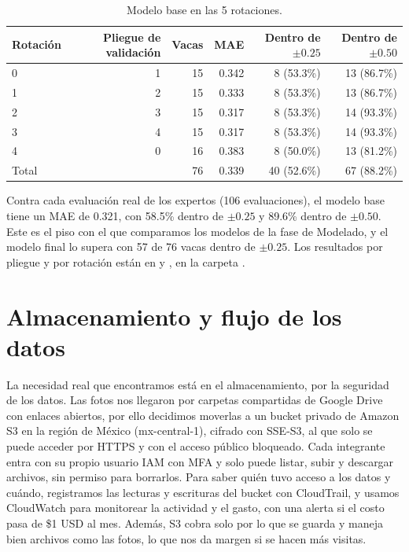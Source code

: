 \documentclass[11pt,letterpaper,DIV=12]{scrartcl}
\begin{document}
\begin{table}[H]
  \centering
  \small
  \caption{Modelo base en las 5 rotaciones.}
  \label{tab:modelo-base}
  \begin{tabular}{lrrrrr}
    \toprule
    Rotación & Pliegue de validación & Vacas & MAE & Dentro de $\pm0.25$ & Dentro de $\pm0.50$ \\
    \midrule
    0 & 1 & 15 & 0.342 & 8 (53.3\%) & 13 (86.7\%) \\
    1 & 2 & 15 & 0.333 & 8 (53.3\%) & 13 (86.7\%) \\
    2 & 3 & 15 & 0.317 & 8 (53.3\%) & 14 (93.3\%) \\
    3 & 4 & 15 & 0.317 & 8 (53.3\%) & 14 (93.3\%) \\
    4 & 0 & 16 & 0.383 & 8 (50.0\%) & 13 (81.2\%) \\
    \midrule
    Total & & 76 & 0.339 & 40 (52.6\%) & 67 (88.2\%) \\
    \bottomrule
  \end{tabular}
\end{table}

Contra cada evaluación real de los expertos (106 evaluaciones), el modelo base tiene un MAE de 0.321, con 58.5\% dentro de $\pm0.25$ y 89.6\% dentro de $\pm0.50$. Este es el piso con el que comparamos los modelos de la fase de Modelado, y el modelo final lo supera con 57 de 76 vacas dentro de $\pm0.25$. Los resultados por pliegue y por rotación están en  y , en la carpeta .

\section{Almacenamiento y flujo de los datos}

La necesidad real que encontramos está en el almacenamiento, por la seguridad de los datos. Las fotos nos llegaron por carpetas compartidas de Google Drive con enlaces abiertos, por ello decidimos moverlas a un bucket privado de Amazon S3 en la región de México (mx-central-1), cifrado con SSE-S3, al que solo se puede acceder por HTTPS y con el acceso público bloqueado. Cada integrante entra con su propio usuario IAM con MFA y solo puede listar, subir y descargar archivos, sin permiso para borrarlos. Para saber quién tuvo acceso a los datos y cuándo, registramos las lecturas y escrituras del bucket con CloudTrail, y usamos CloudWatch para monitorear la actividad y el gasto, con una alerta si el costo pasa de \$1 USD al mes. Además, S3 cobra solo por lo que se guarda y maneja bien archivos como las fotos, lo que nos da margen si se hacen más visitas.
\end{document}
